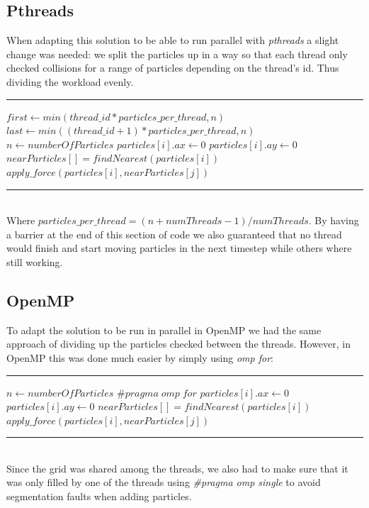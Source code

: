 \documentclass[11pt,a4paper]{article}
\begin{document}
\subsection{Pthreads}
When adapting this solution to be able to run parallel with \emph{pthreads} a slight change was needed: we split the particles up in a way so that each thread only checked collisions for a range of particles depending on the thread's id. Thus dividing the workload evenly.
\\
\rule{125mm}{0.1pt}
\begin{algorithmic}
\STATE $first \gets min(thread\_id * particles\_per\_thread,n)$
\STATE $last \gets min((thread\_id+1) * particles\_per\_thread,n)$
\STATE $n \gets numberOfParticles$
	\STATE $particles[i].ax \gets 0$
	\STATE $particles[i].ay \gets 0$
	\STATE $nearParticles[] = findNearest(particles[i])$
			\STATE $apply\_force(particles[i],nearParticles[j])$
	\ENDFOR
\ENDFOR 
\end{algorithmic}
\rule{125mm}{0.1pt}
\vspace{10pt}
\\
Where $particles\_per\_thread = (n+numThreads-1)/numThreads$. By having a barrier at the end of this section of code we also guaranteed that no thread would finish and start moving particles in the next timestep while others where still working.
\subsection{OpenMP}
To adapt the solution to be run in parallel in OpenMP we had the same approach of dividing up the particles checked between the threads. However, in OpenMP this was done much easier by simply using \emph{omp for}:
\\
\rule{125mm}{0.1pt}
\begin{algorithmic}
\STATE $n \gets numberOfParticles$
\STATE $\#pragma\;omp\;for$
	\STATE $particles[i].ax \gets 0$
	\STATE $particles[i].ay \gets 0$
	\STATE $nearParticles[] = findNearest(particles[i])$
			\STATE $apply\_force(particles[i],nearParticles[j])$
	\ENDFOR
\ENDFOR 
\end{algorithmic}
\rule{125mm}{0.1pt}
\vspace{10pt}
\\
Since the grid was shared among the threads, we also had to make sure that it was only filled by one of the threads using \emph{\#pragma omp single} to avoid segmentation faults when adding particles.
\end{document}
